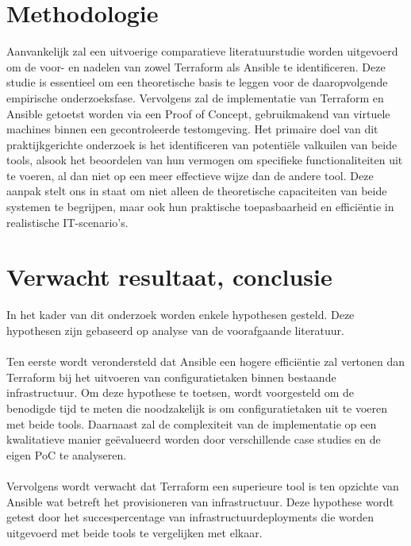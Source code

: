 \section{Methodologie}%
\label{sec:methodologie}

Aanvankelijk zal een uitvoerige comparatieve literatuurstudie worden uitgevoerd om de voor- en nadelen van zowel Terraform als Ansible te identificeren. Deze studie is essentieel om een theoretische basis te leggen voor de daaropvolgende empirische onderzoeksfase. Vervolgens zal de implementatie van Terraform en Ansible getoetst worden via een Proof of Concept, gebruikmakend van virtuele machines binnen een gecontroleerde testomgeving. Het primaire doel van dit praktijkgerichte onderzoek is het identificeren van potentiële valkuilen van beide tools, alsook het beoordelen van hun vermogen om specifieke functionaliteiten uit te voeren, al dan niet op een meer effectieve wijze dan de andere tool. Deze aanpak stelt ons in staat om niet alleen de theoretische capaciteiten van beide systemen te begrijpen, maar ook hun praktische toepasbaarheid en efficiëntie in realistische IT-scenario's.

\section{Verwacht resultaat, conclusie}%
\label{sec:verwachte_resultaten}

In het kader van dit onderzoek worden enkele hypothesen gesteld. Deze hypothesen zijn gebaseerd op analyse van de voorafgaande literatuur. \\\\

Ten eerste wordt verondersteld dat Ansible een hogere efficiëntie zal vertonen dan Terraform bij het uitvoeren van configuratietaken binnen bestaande infrastructuur. Om deze hypothese te toetsen, wordt voorgesteld om de benodigde tijd te meten die noodzakelijk is om configuratietaken uit te voeren met beide tools. Daarnaast zal de complexiteit van de implementatie op een kwalitatieve manier geëvalueerd worden door verschillende case studies en de eigen PoC te analyseren. \\\\

Vervolgens wordt verwacht dat Terraform een superieure tool is ten opzichte van Ansible wat betreft het provisioneren van infrastructuur. Deze hypothese wordt getest door het succespercentage van infrastructuurdeployments die worden uitgevoerd met beide tools te vergelijken met elkaar. \\\\

